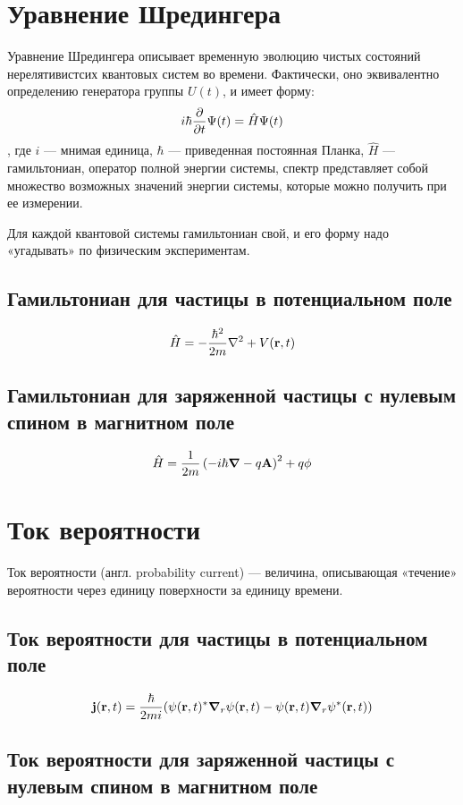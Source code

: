 \section{Уравнение Шредингера}
Уравнение Шредингера описывает временную эволюцию чистых состояний нерелятивистсих квантовых систем во времени. Фактически, оно эквивалентно определению генератора группы $U(t)$, и имеет форму:
\[
i \hbar \pdv{t} \Psi(t) = \hat{H} \Psi(t)
\]
, где $i$ — мнимая единица, $\hbar$ — приведенная постоянная Планка, $\hat{H}$ — гамильтониан, оператор полной энергии системы, спектр представляет собой множество возможных значений энергии системы, которые можно получить при ее измерении.

Для каждой квантовой системы гамильтониан свой, и его форму надо «угадывать» по физическим экспериментам.

\subsection{Гамильтониан для частицы в потенциальном поле}
\[
\hat{H} = - \frac{\hbar^2}{2 m} \laplacian + V(\vb{r}, t)
\]

\subsection{Гамильтониан для заряженной частицы с нулевым спином в магнитном поле}
\[
\hat{H} = \frac{1}{2m} \left( -i \hbar \grad - q \vb{A} \right)^2 + q \phi
\]

\section{Ток вероятности}
Ток вероятности (англ. probability current) — величина, описывающая «течение» вероятности через единицу поверхности за единицу времени. 


\subsection{Ток вероятности для частицы в потенциальном поле}
\[
\vb{j}(\vb{r}, t) = \frac{\hbar}{2 m i} (\psi(\vb{r}, t)^* \grad_r{\psi(\vb{r}, t)} - \psi(\vb{r}, t) \grad_r{\psi^*(\vb{r}, t))}
\]

\subsection{Ток вероятности для заряженной частицы с нулевым спином в магнитном поле}


